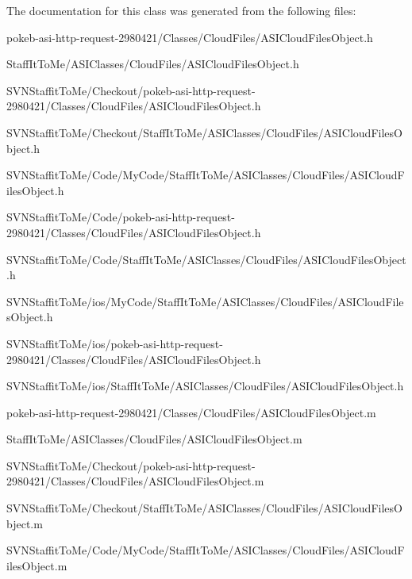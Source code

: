 \-The documentation for this class was generated from the following files\-:\begin{DoxyCompactItemize}
\item 
pokeb-\/asi-\/http-\/request-\/2980421/\-Classes/\-Cloud\-Files/\-A\-S\-I\-Cloud\-Files\-Object.\-h\item 
\-Staff\-It\-To\-Me/\-A\-S\-I\-Classes/\-Cloud\-Files/\-A\-S\-I\-Cloud\-Files\-Object.\-h\item 
\-S\-V\-N\-Staffit\-To\-Me/\-Checkout/pokeb-\/asi-\/http-\/request-\/2980421/\-Classes/\-Cloud\-Files/\-A\-S\-I\-Cloud\-Files\-Object.\-h\item 
\-S\-V\-N\-Staffit\-To\-Me/\-Checkout/\-Staff\-It\-To\-Me/\-A\-S\-I\-Classes/\-Cloud\-Files/\-A\-S\-I\-Cloud\-Files\-Object.\-h\item 
\-S\-V\-N\-Staffit\-To\-Me/\-Code/\-My\-Code/\-Staff\-It\-To\-Me/\-A\-S\-I\-Classes/\-Cloud\-Files/\-A\-S\-I\-Cloud\-Files\-Object.\-h\item 
\-S\-V\-N\-Staffit\-To\-Me/\-Code/pokeb-\/asi-\/http-\/request-\/2980421/\-Classes/\-Cloud\-Files/\-A\-S\-I\-Cloud\-Files\-Object.\-h\item 
\-S\-V\-N\-Staffit\-To\-Me/\-Code/\-Staff\-It\-To\-Me/\-A\-S\-I\-Classes/\-Cloud\-Files/\-A\-S\-I\-Cloud\-Files\-Object.\-h\item 
\-S\-V\-N\-Staffit\-To\-Me/ios/\-My\-Code/\-Staff\-It\-To\-Me/\-A\-S\-I\-Classes/\-Cloud\-Files/\-A\-S\-I\-Cloud\-Files\-Object.\-h\item 
\-S\-V\-N\-Staffit\-To\-Me/ios/pokeb-\/asi-\/http-\/request-\/2980421/\-Classes/\-Cloud\-Files/\-A\-S\-I\-Cloud\-Files\-Object.\-h\item 
\-S\-V\-N\-Staffit\-To\-Me/ios/\-Staff\-It\-To\-Me/\-A\-S\-I\-Classes/\-Cloud\-Files/\-A\-S\-I\-Cloud\-Files\-Object.\-h\item 
pokeb-\/asi-\/http-\/request-\/2980421/\-Classes/\-Cloud\-Files/\-A\-S\-I\-Cloud\-Files\-Object.\-m\item 
\-Staff\-It\-To\-Me/\-A\-S\-I\-Classes/\-Cloud\-Files/\-A\-S\-I\-Cloud\-Files\-Object.\-m\item 
\-S\-V\-N\-Staffit\-To\-Me/\-Checkout/pokeb-\/asi-\/http-\/request-\/2980421/\-Classes/\-Cloud\-Files/\-A\-S\-I\-Cloud\-Files\-Object.\-m\item 
\-S\-V\-N\-Staffit\-To\-Me/\-Checkout/\-Staff\-It\-To\-Me/\-A\-S\-I\-Classes/\-Cloud\-Files/\-A\-S\-I\-Cloud\-Files\-Object.\-m\item 
\-S\-V\-N\-Staffit\-To\-Me/\-Code/\-My\-Code/\-Staff\-It\-To\-Me/\-A\-S\-I\-Classes/\-Cloud\-Files/\-A\-S\-I\-Cloud\-Files\-Object.\-m\item 

\end{DoxyCompactItemize}
